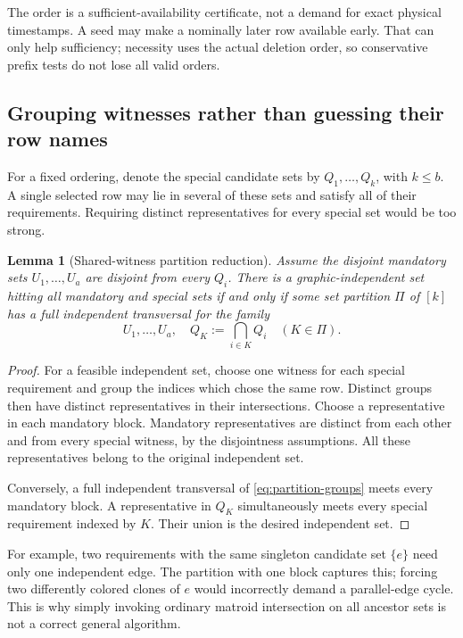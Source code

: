 \documentclass[11pt,letterpaper]{article}
\newtheorem{lemma}[theorem]{Lemma}
\theoremstyle{definition}
\theoremstyle{remark}
\begin{document}
The order is a sufficient-availability certificate, not a demand for exact
physical timestamps. A seed may make a nominally later row available early.
That can only help sufficiency; necessity uses the actual deletion order, so
conservative prefix tests do not lose all valid orders.

\subsection{Grouping witnesses rather than guessing their row names}
For a fixed ordering, denote the special candidate sets by
$Q_1,\ldots,Q_k$, with $k\le b$. A single selected row may lie in several of
these sets and satisfy all of their requirements. Requiring distinct
representatives for every special set would be too strong.

\begin{lemma}[Shared-witness partition reduction]\label{lem:partition}
Assume the disjoint mandatory sets $U_1,\ldots,U_a$ are disjoint from every
$Q_i$. There is a graphic-independent set hitting all mandatory and special
sets if and only if some set partition $\Pi$ of $[k]$ has a full independent
transversal for the family
\begin{equation}\label{eq:partition-groups}
 U_1,\ldots,U_a,\quad
 Q_K:=\bigcap_{i\in K}Q_i\quad(K\in\Pi).
\end{equation}
\end{lemma}
\begin{proof}
For a feasible independent set, choose one witness for each special requirement
and group the indices which chose the same row. Distinct groups then have
distinct representatives in their intersections. Choose a representative in
each mandatory block. Mandatory representatives are distinct from each other
and from every special witness, by the disjointness assumptions. All these
representatives belong to the original independent set.

Conversely, a full independent transversal of \eqref{eq:partition-groups} meets
every mandatory block. A representative in $Q_K$ simultaneously meets every
special requirement indexed by $K$. Their union is the desired independent set.
\end{proof}

For example, two requirements with the same singleton candidate set $\{e\}$
need only one independent edge. The partition with one block captures this;
forcing two differently colored clones of $e$ would incorrectly demand a
parallel-edge cycle. This is why simply invoking ordinary matroid intersection
on all ancestor sets is not a correct general algorithm.
\end{document}
